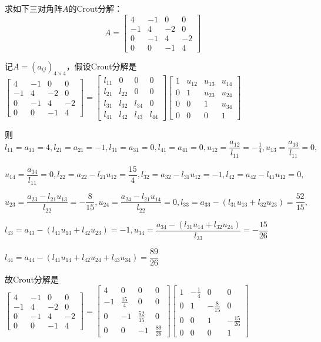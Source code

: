     \begin{homework}[10pts]
        求如下三对角阵$A$的Crout分解：
            \[A=\begin{bmatrix}4&-1&0&0\\-1&4&-2&0\\0&-1&4&-2\\0&0&-1&4\end{bmatrix}\]
    \end{homework}

    \begin{solution}
        记$A=(a_{ij})_{4\times4}$，假设Crout分解是$\begin{bmatrix}4&-1&0&0\\-1&4&-2&0\\0&-1&4&-2\\0&0&-1&4\end{bmatrix}=\begin{bmatrix}l_{11}&0&0&0\\l_{21}&l_{22}&0&0\\l_{31}&l_{32}&l_{34}&0\\l_{41}&l_{42}&l_{43}&l_{44}\end{bmatrix}\begin{bmatrix}1&u_{12}&u_{13}&u_{14}\\0&1&u_{23}&u_{24}\\0&0&1&u_{34}\\0&0&0&1\end{bmatrix}$

        则$l_{11}=a_{11}=4,l_{21}=a_{21}=-1,l_{31}=a_{31}=0,l_{41}=a_{41}=0,u_{12}=\dfrac{a_{12}}{l_{11}}=-\frac14,u_{13}=\dfrac{a_{13}}{l_{11}}=0,$

        $u_{14}=\dfrac{a_{14}}{l_{11}}=0,l_{22}=a_{22}-l_{21}u_{12}=\dfrac{15}4,l_{32}=a_{32}-l_{31}u_{12}=-1,l_{42}=a_{42}-l_{41}u_{12}=0,$

        $u_{23}=\dfrac{a_{23}-l_{21}u_{13}}{l_{22}}=-\dfrac8{15},u_{24}=\dfrac{a_{24}-l_{21}u_{14}}{l_{22}}=0,l_{33}=a_{33}-(l_{31}u_{13}+l_{32}u_{23})=\dfrac{52}{15},$

        $l_{43}=a_{43}-(l_{41}u_{13}+l_{42}u_{23})=-1,u_{34}=\dfrac{a_{34}-(l_{31}u_{14}+l_{32}u_{24})}{l_{33}}=-\dfrac{15}{26}$

        $l_{44}=a_{44}-(l_{41}u_{14}+l_{42}u_{24}+l_{43}u_{34})=\dfrac{89}{26}$

        故Crout分解是$\begin{bmatrix}4&-1&0&0\\-1&4&-2&0\\0&-1&4&-2\\0&0&-1&4\end{bmatrix}=\begin{bmatrix}4&0&0&0\\-1&\frac{15}4&0&0\\0&-1&\frac{52}{15}&0\\0&0&-1&\frac{89}{26}\end{bmatrix}\begin{bmatrix}1&-\frac14&0&0\\0&1&-\frac8{15}&0\\0&0&1&-\frac{15}{26}\\0&0&0&1\end{bmatrix}$
    \end{solution}

